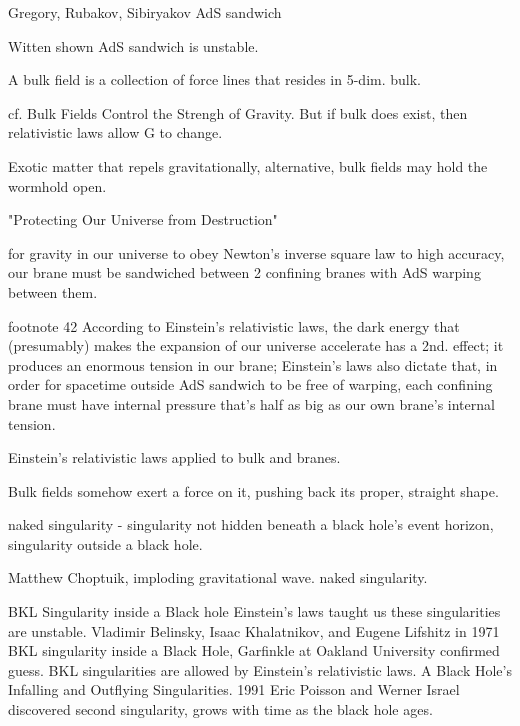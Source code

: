 \documentclass[10pt]{amsart}
\begin{document}
Gregory, Rubakov, Sibiryakov AdS sandwich

Witten shown AdS sandwich is unstable.

A bulk field is a collection of force lines that resides in 5-dim. bulk.

cf. Bulk Fields Control the Strengh of Gravity. But if bulk does exist, then relativistic laws allow G to change.

Exotic matter that repels gravitationally,
alternative, bulk fields may hold the wormhold open.

"Protecting Our Universe from Destruction"

for gravity in our universe to obey Newton's inverse square law to high accuracy, our brane must be sandwiched between 2 confining branes with AdS warping between them.

footnote 42 
According to Einstein's relativistic laws, the dark energy that (presumably) makes the expansion of our universe accelerate has a 2nd. effect; it produces an enormous tension in our brane; Einstein's laws also dictate that, in order for spacetime outside AdS sandwich to be free of warping, each confining brane must have internal pressure that's half as big as our own brane's internal tension.

Einstein's relativistic laws applied to bulk and branes.

Bulk fields somehow exert a force on it, pushing back its proper, straight shape.

naked singularity - singularity not hidden beneath a black hole's event horizon, singularity outside a black hole.

Matthew Choptuik, imploding gravitational wave. naked singularity.

BKL Singularity inside a Black hole
Einstein's laws taught us these singularities are unstable. Vladimir Belinsky, Isaac Khalatnikov, and Eugene Lifshitz in 1971 BKL singularity inside a Black Hole, Garfinkle at Oakland University confirmed guess. 
BKL singularities are allowed by Einstein's relativistic laws.
A Black Hole's Infalling and Outflying Singularities.
1991 Eric Poisson and Werner Israel discovered second singularity, grows with time as the black hole ages.
\end{document}
